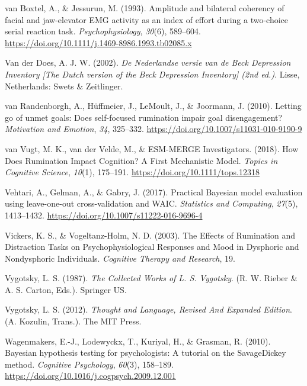 \documentclass[a4paper,12pt,twoside,openright,oldfontcommands,final]{memoir}
\begin{document}
\leavevmode\hypertarget{ref-van_boxtel_amplitude_1993}{}%
van Boxtel, A., \& Jessurun, M. (1993). Amplitude and bilateral coherency of facial and jaw-elevator EMG activity as an index of effort during a two-choice serial reaction task. \emph{Psychophysiology}, \emph{30}(6), 589--604. \url{https://doi.org/10.1111/j.1469-8986.1993.tb02085.x}

\leavevmode\hypertarget{ref-van_der_does_nederlandse_2002}{}%
Van der Does, A. J. W. (2002). \emph{De Nederlandse versie van de Beck Depression Inventory {[}The Dutch version of the Beck Depression Inventory{]} (2nd ed.)}. Lisse, Netherlands: Swets \& Zeitlinger.

\leavevmode\hypertarget{ref-VanRandenborgh2010}{}%
van Randenborgh, A., Hüffmeier, J., LeMoult, J., \& Joormann, J. (2010). Letting go of unmet goals: Does self-focused rumination impair goal disengagement? \emph{Motivation and Emotion}, \emph{34}, 325--332. \url{https://doi.org/10.1007/s11031-010-9190-9}

\leavevmode\hypertarget{ref-van_vugt_how_2018}{}%
van Vugt, M. K., van der Velde, M., \& ESM-MERGE Investigators. (2018). How Does Rumination Impact Cognition? A First Mechanistic Model. \emph{Topics in Cognitive Science}, \emph{10}(1), 175--191. \url{https://doi.org/10.1111/tops.12318}

\leavevmode\hypertarget{ref-vehtari_practical_2017}{}%
Vehtari, A., Gelman, A., \& Gabry, J. (2017). Practical Bayesian model evaluation using leave-one-out cross-validation and WAIC. \emph{Statistics and Computing}, \emph{27}(5), 1413--1432. \url{https://doi.org/10.1007/s11222-016-9696-4}

\leavevmode\hypertarget{ref-vickers_effects_2003}{}%
Vickers, K. S., \& Vogeltanz-Holm, N. D. (2003). The Effects of Rumination and Distraction Tasks on Psychophysiological Responses and Mood in Dysphoric and Nondysphoric Individuals. \emph{Cognitive Therapy and Research}, 19.

\leavevmode\hypertarget{ref-vygotsky_collected_1987}{}%
Vygotsky, L. S. (1987). \emph{The Collected Works of L. S. Vygotsky}. (R. W. Rieber \& A. S. Carton, Eds.). Springer US.

\leavevmode\hypertarget{ref-vygotsky_thought_2012}{}%
Vygotsky, L. S. (2012). \emph{Thought and Language, Revised And Expanded Edition}. (A. Kozulin, Trans.). The MIT Press.

\leavevmode\hypertarget{ref-wagenmakers_bayesian_2010}{}%
Wagenmakers, E.-J., Lodewyckx, T., Kuriyal, H., \& Grasman, R. (2010). Bayesian hypothesis testing for psychologists: A tutorial on the SavageDickey method. \emph{Cognitive Psychology}, \emph{60}(3), 158--189. \url{https://doi.org/10.1016/j.cogpsych.2009.12.001}
\end{document}
